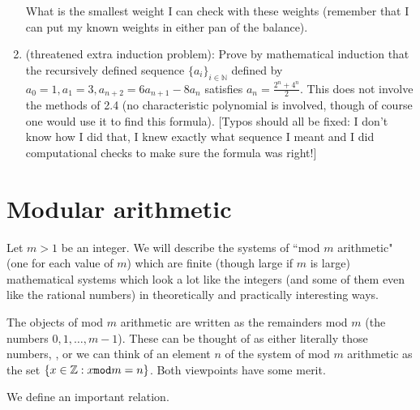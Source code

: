\documentclass[12pt]{article}
\begin{document}
\begin{enumerate}
What is the smallest weight I can check with these weights (remember that I can put my known weights in either pan of the balance).

\item (threatened extra induction problem):  Prove by mathematical induction that the recursively defined sequence $\{a_i\}_{i \in \mathbb N}$ defined by $a_0=1, a_1= 3, a_{n+2} = 6a_{n+1}-8a_n$ satisfies $a_n = \frac{2^n+4^n}2$.  This does not involve the methods of 2.4 (no characteristic polynomial is involved, though of course one would use it to find this formula). [Typos should all be fixed:  I don't know how I did that, I knew exactly what sequence I meant and I did computational checks to make sure the formula was right!]

\end{enumerate}


\section{Modular arithmetic}

Let $m>1$ be an integer.  We will describe the systems of ``mod $m$ arithmetic" (one for each value of $m$) which are finite (though large if $m$ is large) mathematical systems which look a lot like the integers (and some of them even like the rational numbers) in theoretically and practically interesting ways.

The objects of mod $m$ arithmetic are written as the remainders mod $m$ (the numbers $0,1,\ldots,m-1$).  These can be thought of as either literally those numbers, , or we can think of an element $n$ of the system of mod $m$ arithmetic as the set $\{x \in \mathbb Z:x {\tt mod}m = n\}$.  Both viewpoints have some merit.

We define an important relation.
\end{document}
